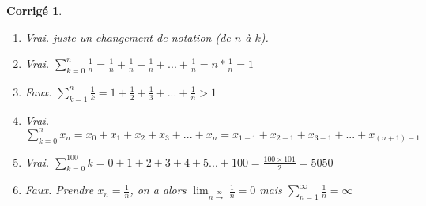 \documentclass[11pt,french,table]{article}
\theoremstyle{exercice}
\theoremstyle{corrigé}
\newtheorem{corrigé}{Corrigé}
\begin{document}
\vspace{1em}
\begin{corrigé}
\begin{enumerate}
    \item [(a)] Vrai. juste un changement de notation (de $n$ à $k$).
    \item[(b)] Vrai. $\sum_{k=0}^{n} \frac{1}{n}=\frac{1}{n}+\frac{1}{n}+\frac{1}{n}+...+\frac{1}{n}=n*\frac{1}{n}=1$
    \item[(c)] Faux. $\sum_{k=1}^{n} \frac{1}{k}=1+\frac{1}{2}+\frac{1}{3}+...+\frac{1}{n}>1$
    \item[(d)] Vrai. $\sum_{k=0}^{n}x_n=x_0+x_1+x_2+x_3+...+x_n=x_{1-1}+x_{2-1}+x_{3-1}+...+x_{(n+1)-1}$
    \item[(e)] Vrai. $\sum_{k=0}^{100} k=0+1+2+3+4+5...+100=\frac{100\times101}{2}=5050$
    \item[(f)] Faux. Prendre $x_n=\frac{1}{n}$, on a alors $\lim_{n\xrightarrow[] \infty}{\frac{1}{n}}=0$ mais $\sum_{n=1}^{\infty}\frac{1}{n}=\infty$
    \end{enumerate}
\end{corrigé}
\end{document}
